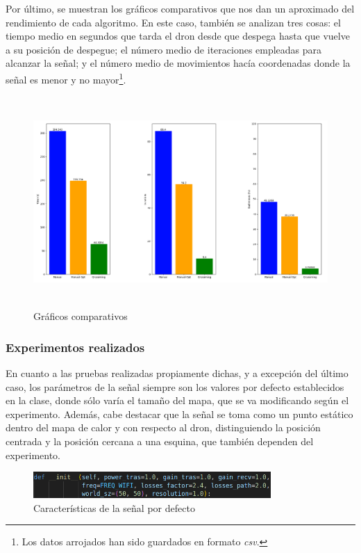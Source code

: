 Por último, se muestran los gráficos comparativos que nos dan un aproximado del rendimiento de cada algoritmo. En este caso, también se analizan tres cosas: el tiempo medio en segundos que tarda el dron desde que despega hasta que vuelve a su posición de despegue; el número medio de iteraciones empleadas para alcanzar la señal; y el número medio de movimientos hacía coordenadas donde la señal es menor y no mayor\footnote[4]{Los datos arrojados han sido guardados en formato \emph{csv}.}.\\

\begin{figure} [H]
    \begin{center}
    \includegraphics[height=8cm]{imagenes/cap4/15_avg_graphs.png}
    \end{center}
    \caption[Gráficos comparativos]{Gráficos comparativos}
    \label{fig:compare_graph}
\end{figure}

\subsubsection{Experimentos realizados}
\label{subsubsec:experimentos}

En cuanto a las pruebas realizadas propiamente dichas, y a excepción del último caso, los parámetros de la señal siempre son los valores por defecto establecidos en la clase, donde sólo varía el tamaño del mapa, que se va modificando según el experimento. Además, cabe destacar que la señal se toma como un punto estático dentro del mapa de calor y con respecto al dron, distinguiendo la posición centrada y la posición cercana a una esquina, que también dependen del experimento.\\

\begin{figure} [H]
    \begin{center}
    \includegraphics[height=1cm]{imagenes/cap4/16_default_values.png}
    \end{center}
    \caption[Características de la señal por defecto]{Características de la señal por defecto}
    \label{fig:compare_graph}
\end{figure}

